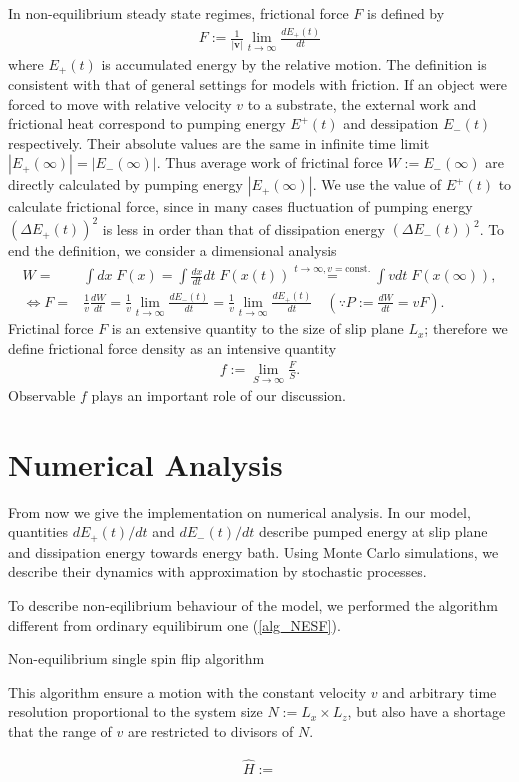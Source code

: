 In non-equilibrium steady state regimes, frictional force $F$ is defined by
\begin{align}
	F:=\frac{1}{|\bm{v}|}\lim\limits_{t\to\infty}\frac{dE_{+}(t)}{dt}
\end{align}
where $E_{+}(t)$ is accumulated energy by the relative motion. The definition is consistent with that of general settings for models with friction. If an object were forced to move with relative velocity $v$ to a substrate, the external work and frictional heat correspond to pumping energy $E^{+}(t)$ and dessipation $E_{-}(t)$ respectively. Their absolute values are the same in infinite time limit $|E_{+}(\infty)|=|E_{-}(\infty)|$. Thus average work of frictinal force $W:=E_{-}(\infty)$ are directly calculated by pumping energy $|E_{+}(\infty)|$. We use the value of $E^{+}(t)$ to calculate frictional force, since in many cases fluctuation of pumping energy $\left(\Delta E_{+}(t)\right)^{2}$ is less in order than that of dissipation energy $\left(\Delta E_{-}(t)\right)^{2}$. To end the definition, we consider a dimensional analysis
\begin{align}
	W =& \int dx\;F(x) = \int \frac{dx}{dt}dt\;F\left(x(t)\right)\overset{t\to\infty, v=\text{const.}}{=} \int v dt\;F\left(x(\infty)\right),\\
	\Leftrightarrow F =& \frac{1}{v}\frac{dW}{dt} = \frac{1}{v}\lim\limits_{t\to\infty}\frac{dE_{-}(t)}{dt} = \frac{1}{v}\lim\limits_{t\to\infty}\frac{dE_{+}(t)}{dt}\quad (\because P := \frac{dW}{dt} = vF).
\end{align}
Frictinal force $F$ is an extensive quantity to the size of slip plane $L_{x}$; therefore we define frictional force density as an intensive quantity
\begin{align}
	f:=\lim\limits_{S\to\infty}\frac{F}{S}\label{frictionalForce}.
\end{align}
Observable $f$ plays an important role of our discussion.

\section{Numerical Analysis}

From now we give the implementation on numerical analysis. In our model, quantities $dE_{+}(t)/dt$ and $dE_{-}(t)/dt$ describe pumped energy at slip plane and dissipation energy towards energy bath. Using Monte Carlo simulations, we describe their dynamics with approximation by stochastic processes.

To describe non-eqilibrium behaviour of the model, we performed the algorithm different from ordinary equilibirum one (\ref{alg_NESF}).
\begin{algorithm}
	\caption{Non-equilibrium single spin flip algorithm}         
	\label{alg_NESF}   
\end{algorithm}

This algorithm ensure a motion with the constant velocity $v$ and arbitrary time resolution proportional to the system size $N:=L_{x}\times L_{z}$, but also have a shortage that the range of $v$ are restricted to divisors of $N$. 

\begin{align}
	\hat{H}:=
\end{align}


